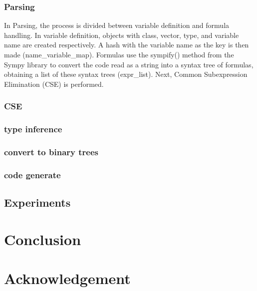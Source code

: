 \documentclass[ams, a4j]{U-AizuGT}
\begin{document}
\subsubsection{Parsing}
In Parsing, the process is divided between variable definition and formula handling. In variable definition, 
objects with class, vector, type, and variable name are created respectively. A hash with the variable name
as the key is then made (name\_variable\_map). Formulas use the sympify() method from the Sympy library to convert
the code read as a string into a syntax tree of formulas, obtaining a list of these syntax trees (expr\_list). Next, 
Common Subexpression Elimination (CSE) is performed.
\subsubsection{CSE}

\subsubsection{type inference}
\subsubsection{convert to binary trees}
\subsubsection{code generate}




\subsection{Experiments}

\section{Conclusion}
\section{Acknowledgement}

\end{document}
